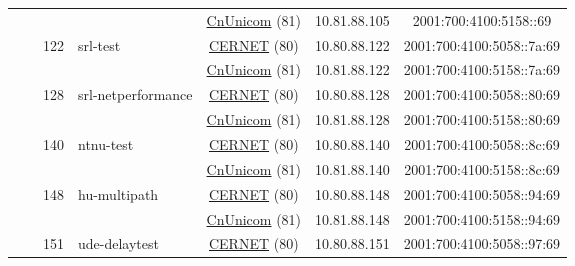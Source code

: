 \begin{small}
\begin{center}
\begin{longtable}{|c|c|c|c|c|c|c|c|}
  &  & \multicolumn{2}{|c|}{} & \multicolumn{2}{|c|}{\tiny{\href{http://www.chinaunicom.com}{CnUnicom} (81)}} & \tiny{10.81.88.105} & \tiny{2001:700:4100:5158::69} \\* \cline{3-3}\cline{4-4}\cline{5-5}\cline{6-6}\cline{7-7}\cline{8-8}
  &  & \multirow{2}{*}{\tiny{122}} & \multicolumn{1}{|l|}{\multirow{2}{*}{\tiny{srl-test}}} & \multicolumn{2}{|c|}{\tiny{\href{http://www.cernet.edu.cn}{CERNET} (80)}} & \tiny{10.80.88.122} & \tiny{2001:700:4100:5058::7a:69} \\* \cline{5-5}\cline{6-6}\cline{7-7}\cline{8-8}
  &  &  &  & \multicolumn{2}{|c|}{\tiny{\href{http://www.chinaunicom.com}{CnUnicom} (81)}} & \tiny{10.81.88.122} & \tiny{2001:700:4100:5158::7a:69} \\* \cline{3-3}\cline{4-4}\cline{5-5}\cline{6-6}\cline{7-7}\cline{8-8}
  &  & \multirow{2}{*}{\tiny{128}} & \multicolumn{1}{|l|}{\multirow{2}{*}{\tiny{srl-netperformance}}} & \multicolumn{2}{|c|}{\tiny{\href{http://www.cernet.edu.cn}{CERNET} (80)}} & \tiny{10.80.88.128} & \tiny{2001:700:4100:5058::80:69} \\* \cline{5-5}\cline{6-6}\cline{7-7}\cline{8-8}
  &  &  &  & \multicolumn{2}{|c|}{\tiny{\href{http://www.chinaunicom.com}{CnUnicom} (81)}} & \tiny{10.81.88.128} & \tiny{2001:700:4100:5158::80:69} \\* \cline{3-3}\cline{4-4}\cline{5-5}\cline{6-6}\cline{7-7}\cline{8-8}
  &  & \multirow{2}{*}{\tiny{140}} & \multicolumn{1}{|l|}{\multirow{2}{*}{\tiny{ntnu-test}}} & \multicolumn{2}{|c|}{\tiny{\href{http://www.cernet.edu.cn}{CERNET} (80)}} & \tiny{10.80.88.140} & \tiny{2001:700:4100:5058::8c:69} \\* \cline{5-5}\cline{6-6}\cline{7-7}\cline{8-8}
  &  &  &  & \multicolumn{2}{|c|}{\tiny{\href{http://www.chinaunicom.com}{CnUnicom} (81)}} & \tiny{10.81.88.140} & \tiny{2001:700:4100:5158::8c:69} \\* \cline{3-3}\cline{4-4}\cline{5-5}\cline{6-6}\cline{7-7}\cline{8-8}
  &  & \multirow{2}{*}{\tiny{148}} & \multicolumn{1}{|l|}{\multirow{2}{*}{\tiny{hu-multipath}}} & \multicolumn{2}{|c|}{\tiny{\href{http://www.cernet.edu.cn}{CERNET} (80)}} & \tiny{10.80.88.148} & \tiny{2001:700:4100:5058::94:69} \\* \cline{5-5}\cline{6-6}\cline{7-7}\cline{8-8}
  &  &  &  & \multicolumn{2}{|c|}{\tiny{\href{http://www.chinaunicom.com}{CnUnicom} (81)}} & \tiny{10.81.88.148} & \tiny{2001:700:4100:5158::94:69} \\* \cline{3-3}\cline{4-4}\cline{5-5}\cline{6-6}\cline{7-7}\cline{8-8}
  &  & \multirow{2}{*}{\tiny{151}} & \multicolumn{1}{|l|}{\multirow{2}{*}{\tiny{ude-delaytest}}} & \multicolumn{2}{|c|}{\tiny{\href{http://www.cernet.edu.cn}{CERNET} (80)}} & \tiny{10.80.88.151} & \tiny{2001:700:4100:5058::97:69} \\* \cline{5-5}\cline{6-6}\cline{7-7}\cline{8-8}

\end{longtable}
\end{center}
\end{small}

